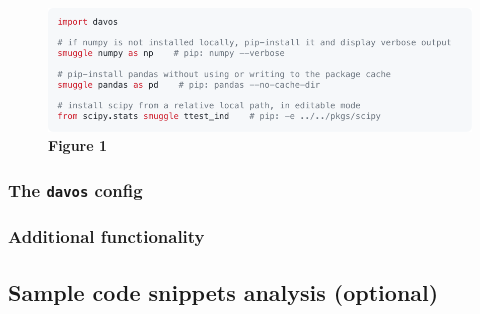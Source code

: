 \documentclass[preprint,12pt, a4paper]{elsarticle}
\begin{document}
\begin{figure}[h]
\centering
\includegraphics[width=\textwidth]{snippets/snippet1.pdf}
\caption{\small \textbf{Figure 1}}
\label{fig:snippet1}
\end{figure}



%
%
%
%
%

\subsubsection{The \texttt{davos} config}

\subsubsection{Additional functionality}



\subsection{Sample code snippets analysis (optional)}


\end{document}
